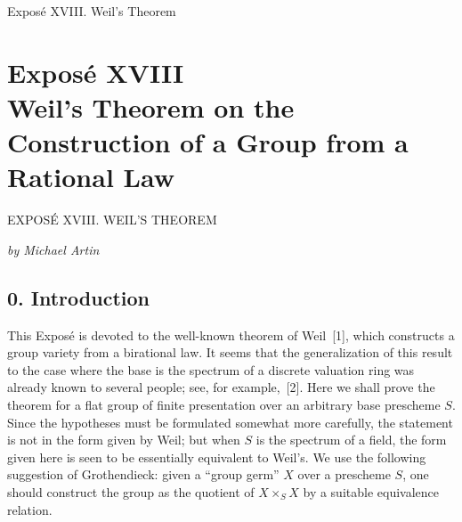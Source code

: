 
  {Exposé XVIII. Weil's Theorem}

\setcounter{footnote}{0}
\chapter*{Exposé XVIII\\
Weil's Theorem on the Construction of a Group from a Rational Law}
  {EXPOSÉ XVIII. WEIL'S THEOREM}

\begin{center}
  \textit{by Michael Artin}
\end{center}
\begingroup
\renewcommand{\thefootnote}{0}
\endgroup

\section*{0. Introduction}

This Exposé is devoted to the well-known theorem of Weil~[1], which
constructs a group variety from a birational law. It seems that the
generalization of this result to the case where the base is the
spectrum of a discrete valuation ring was already known to several
people; see, for example,~[2]. Here we shall prove the theorem for a
flat group of finite presentation over an arbitrary base prescheme
\(S\). Since the hypotheses must be formulated somewhat more
carefully, the statement is not in the form given by Weil; but when
\(S\) is the spectrum of a field, the form given here is seen to be
essentially equivalent to Weil's. We use the following suggestion of
Grothendieck: given a ``group germ'' \(X\) over a prescheme \(S\), one
should construct the group as the quotient of \(X\times_S X\) by a
suitable equivalence relation.


